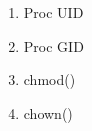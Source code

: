 \documentclass[11pt,letterpaper]{report}
\begin{document}
\begin{enumerate}
                                                                                                                                                                                                                                                                                                                                                                                                                                                                                                                                    \begin{enumerate}
                                                                                                                                                                                                                                                                                                                                                                                                                                                                                                                                            \item Proc UID
                                                                                                                                                                                                                                                                                                                                                                                                                                                                                                                                                    \item Proc GID
                                                                                                                                                                                                                                                                                                                                                                                                                                                                                                                                                            \item chmod()
                                                                                                                                                                                                                                                                                                                                                                                                                                                                                                                                                                    \item chown()

\end{enumerate}
\end{enumerate}
\end{document}
